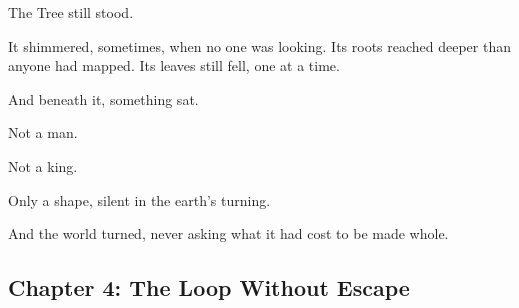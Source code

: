 \documentclass[9pt]{article}
\begin{document}
The Tree still stood.

It shimmered, sometimes, when no one was looking. Its roots reached deeper than anyone had mapped. Its leaves still fell, one at a time.

And beneath it, something sat.

Not a man.

Not a king.

Only a shape, silent in the earth’s turning.

And the world turned, never asking what it had cost to be made whole.

\newpage

\subsection*{Chapter 4: The Loop Without Escape}

\vspace{1in}
\end{document}
